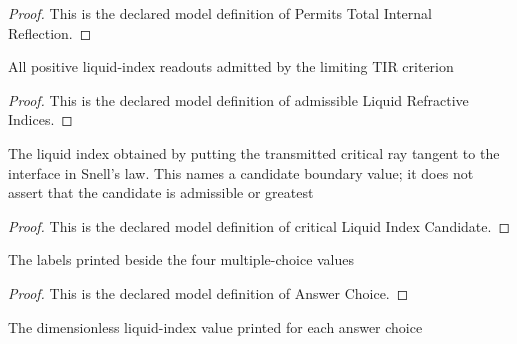 \begin{proof}
  This is the declared model definition of Permits Total Internal Reflection.
\end{proof}
\begin{definition}
  \label{def:physics:phyx-mini-0100:phyxminiproblems-problemphyxmini0100-admissibleliquidrefractiveindices}
  All positive liquid-index readouts admitted by the limiting TIR criterion
\end{definition}
\begin{proof}
  This is the declared model definition of admissible Liquid Refractive Indices.
\end{proof}
\begin{definition}
  \label{def:physics:phyx-mini-0100:phyxminiproblems-problemphyxmini0100-criticalliquidindexcandidate}
  The liquid index obtained by putting the transmitted critical ray tangent to the interface in Snell's law. This names a candidate boundary value; it does not assert that the candidate is admissible or greatest
\end{definition}
\begin{proof}
  This is the declared model definition of critical Liquid Index Candidate.
\end{proof}
\begin{definition}
  \label{def:physics:phyx-mini-0100:phyxminiproblems-problemphyxmini0100-answerchoice}
  The labels printed beside the four multiple-choice values
\end{definition}
\begin{proof}
  This is the declared model definition of Answer Choice.
\end{proof}
\begin{definition}
  \label{def:physics:phyx-mini-0100:phyxminiproblems-problemphyxmini0100-answerchoicerefractiveindex}
  The dimensionless liquid-index value printed for each answer choice
\end{definition}
